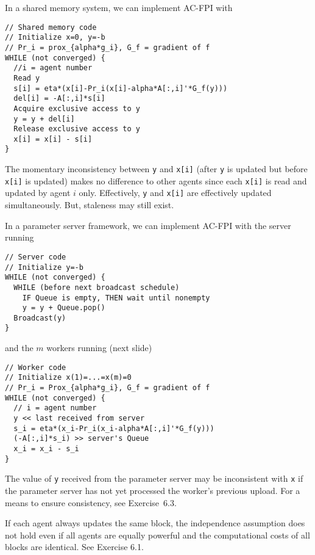 \documentclass[10pt,mathserif]{beamer}
\begin{document}
\begin{frame}[fragile]


In a shared memory system, we can implement AC-FPI with
\begin{lstlisting}
// Shared memory code
// Initialize x=0, y=-b
// Pr_i = prox_{alpha*g_i}, G_f = gradient of f
WHILE (not converged) {
  //i = agent number
  Read y
  s[i] = eta*(x[i]-Pr_i(x[i]-alpha*A[:,i]'*G_f(y)))
  del[i] = -A[:,i]*s[i]
  Acquire exclusive access to y
  y = y + del[i]
  Release exclusive access to y
  x[i] = x[i] - s[i]
}
\end{lstlisting}
The momentary inconsistency between \verb!y! and \verb!x[i]! (after \verb!y! is updated but before \verb!x[i]! is updated) makes no difference to other agents since each \verb!x[i]! is read and updated by agent $i$ only. Effectively, \verb!y! and \verb!x[i]! are effectively updated simultaneously. But, staleness may still exist.


\end{frame}

\begin{frame}[fragile]
In a parameter server framework, we can implement AC-FPI with the server running
\begin{lstlisting}
// Server code
// Initialize y=-b
WHILE (not converged) {
  WHILE (before next broadcast schedule)
    IF Queue is empty, THEN wait until nonempty
    y = y + Queue.pop() 
  Broadcast(y)
}
\end{lstlisting}
and the $m$ workers running (next slide)
\end{frame}

\begin{frame}[fragile]
\begin{lstlisting}
// Worker code
// Initialize x(1)=...=x(m)=0
// Pr_i = Prox_{alpha*g_i}, G_f = gradient of f
WHILE (not converged) {
  // i = agent number
  y << last received from server
  s_i = eta*(x_i-Pr_i(x_i-alpha*A[:,i]'*G_f(y)))
  (-A[:,i]*s_i) >> server's Queue
  x_i = x_i - s_i
}
\end{lstlisting}
\medskip

The value of \verb|y| received from the parameter server may be inconsistent with \verb|x| if the parameter server has not yet processed the worker's previous upload. For a means to ensure consistency, see Exercise~6.3.
\medskip

If each agent always updates the same block, the independence assumption does not hold even if all agents are equally powerful and the computational costs of all blocks are identical.
See Exercise 6.1.

\end{frame}
\end{document}
